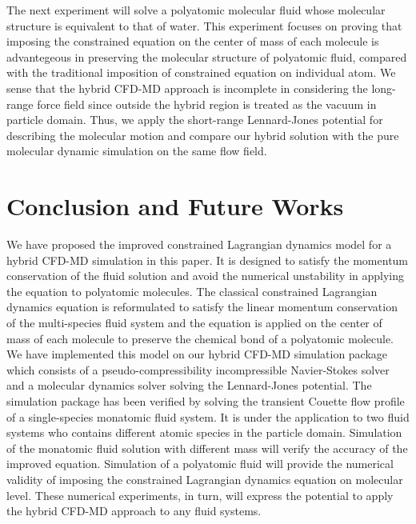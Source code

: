 \documentclass[]{aiaa-tc}%
\begin{document}
The next experiment will solve a polyatomic molecular fluid whose
molecular structure is equivalent to that of water. This experiment 
focuses on proving that imposing the constrained equation on the center
of mass of each molecule is advantegeous in preserving the molecular
structure of polyatomic fluid, compared with the traditional imposition
of constrained equation on individual atom. We sense that the hybrid
CFD-MD approach is incomplete in considering the long-range force field
since outside the hybrid region is treated as the vacuum in particle
domain. Thus, we apply the short-range Lennard-Jones potential for
describing the molecular motion and compare our hybrid solution with
the pure molecular dynamic simulation on the same flow field.



\section{Conclusion and Future Works}
\label{sec:conclusion}

We have proposed the improved constrained Lagrangian dynamics model for 
a hybrid CFD-MD simulation in this paper. It is designed to satisfy 
the momentum conservation of the fluid solution and avoid the numerical
unstability in applying the equation to polyatomic molecules. The 
classical constrained Lagrangian dynamics equation is reformulated
to satisfy the linear momentum conservation of the multi-species fluid
system and the equation is applied on the center of mass of each 
molecule to preserve the chemical bond of a polyatomic molecule.
We have implemented this model on our hybrid CFD-MD simulation package
which consists of a pseudo-compressibility incompressible Navier-Stokes
solver and a molecular dynamics solver solving the Lennard-Jones
potential. The simulation package has been verified by solving the 
transient Couette flow profile of a single-species monatomic fluid 
system.
It is under the application to two fluid systems who contains different
atomic species in the particle domain. Simulation of the monatomic 
fluid solution with different mass will verify the accuracy of
the improved equation. Simulation of a polyatomic fluid will provide 
the numerical validity of imposing the constrained Lagrangian dynamics
equation on molecular level. These numerical experiments, in turn, will
express the potential to apply the hybrid CFD-MD approach to any fluid
systems.
\end{document}
